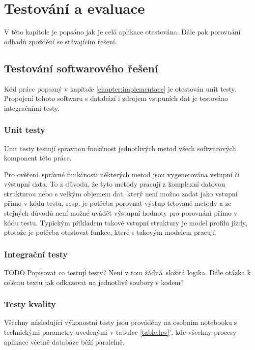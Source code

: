 
\chapter{Testování a evaluace}

V této kapitole je popsáno jak je celá aplikace otestována. Dále pak porovnání odhadů zpoždění se stávajícím řešení.

\section{Testování softwarového řešení}

Kód práce popsaný v kapitole \ref{chapter:implementace} je otestován unit testy. Propojení  tohoto softwaru s databází i zdrojem vstpuních dat je testováno integračními testy.

\subsection{Unit testy}

Unit testy testují spravnou funkčnost jednotlivých metod všech softwarových komponent této práce.

Pro ověření správné funkčnosti některých metod jsou vygenerována vstupní či výstupní data. To z důvodu, že tyto metody pracují z komplexní datovou strukturou nebo s velkým objemem dat, který není možno zadat jako vstupní přímo v kódu testu, resp. je potřeba porovnat výstup tetované metody a ze stejných důvodů není možné uvádět výstupní hodnoty pro porovnání přímo v kódu testu. Typickým příkladem takové vstupní struktury je model profilu jízdy, ptotože je potřeba otestovat funkce, které s takovým modelem pracují.

\subsection{Integrační testy}

TODO Popisovat co testují testy? Není v tom žádná složitá logika. Dále otázka k celému textu jak odkazovat na jednotlivé soubory s kodem?

\subsection{Testy kvality}

Všechny následující výkonostní testy jsou prováděny na osobním notebooku s technickými parametry uvedenými v tabulce \ref{table:hw}', kde všechny procesy aplikace včetně databáze běží paralelně.

